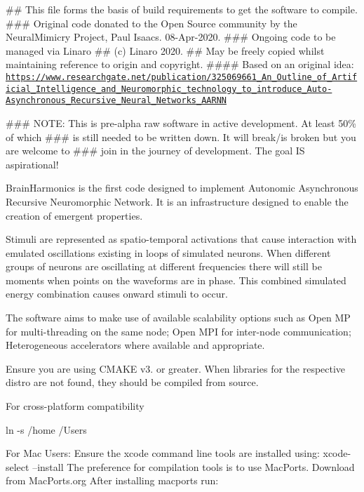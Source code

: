 \#\# This file forms the basis of build requirements to get the software to compile. \#\#\# Original code donated to the Open Source community by the Neural\+Mimicry Project, Paul Isaac\textquotesingle{}s. 08-\/\+Apr-\/2020. \#\#\# Ongoing code to be managed via Linaro \#\# (c) Linaro 2020. \#\# May be freely copied whilst maintaining reference to origin and copyright. \#\#\#\# Based on an original idea\+: \href{https://www.researchgate.net/publication/325069661_An_Outline_of_Artificial_Intelligence_and_Neuromorphic_technology_to_introduce_Auto-Asynchronous_Recursive_Neural_Networks_AARNN}{\tt https\+://www.\+researchgate.\+net/publication/325069661\+\_\+\+An\+\_\+\+Outline\+\_\+of\+\_\+\+Artificial\+\_\+\+Intelligence\+\_\+and\+\_\+\+Neuromorphic\+\_\+technology\+\_\+to\+\_\+introduce\+\_\+\+Auto-\/\+Asynchronous\+\_\+\+Recursive\+\_\+\+Neural\+\_\+\+Networks\+\_\+\+A\+A\+R\+NN}

\#\#\# N\+O\+TE\+: This is pre-\/alpha raw software in active development. At least 50\% of which \#\#\# is still needed to be written down. It will break/is broken but you are welcome to \#\#\# join in the journey of development. The goal IS aspirational!

Brain\+Harmonics is the first code designed to implement Autonomic Asynchronous Recursive Neuromorphic Network. It is an infrastructure designed to enable the creation of emergent properties.

Stimuli are represented as spatio-\/temporal activations that cause interaction with emulated oscillations existing in loops of simulated neurons. When different groups of neurons are oscillating at different frequencies there will still be moments when points on the waveforms are in phase. This combined simulated energy combination causes onward stimuli to occur.

The software aims to make use of available scalability options such as Open MP for multi-\/threading on the same node; Open M\+PI for inter-\/node communication; Heterogeneous accelerators where available and appropriate.

Ensure you are using C\+M\+A\+KE v3. or greater. When libraries for the respective distro are not found, they should be compiled from source.

For cross-\/platform compatibility


\begin{DoxyCode}
ln -s /home /Users
\end{DoxyCode}


For Mac Users\+: Ensure the xcode command line tools are installed using\+: xcode-\/select --install The preference for compilation tools is to use Mac\+Ports. Download from Mac\+Ports.\+org After installing macports run\+:


